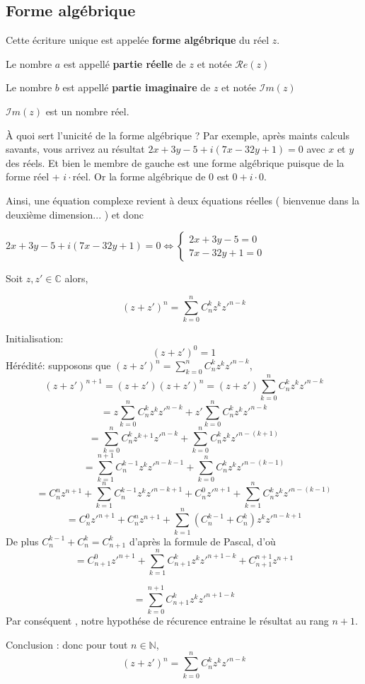 \documentclass[french]{book}
\newcommand{\bbc}{\mathbb {C}}
\newcommand{\calr}{\mathscr{R}}
\newcommand{\cali}{\mathscr{I}}
\newcommand{\RR}{\calr }
\newcommand{\IR}{\cali }
\begin{document}
\subsection{Forme algébrique}

Cette écriture unique est appelée \textbf{forme algébrique} du réel $z$.

Le nombre $a$ est appellé \textbf{partie réelle} de  $z$ et notée $\RR e(z)$

Le nombre $b$ est appellé \textbf{partie imaginaire} de  $z$ et notée $\IR m(z)$


  \begin{rem}
    $\IR m(z)$ est un nombre réel.
    \end{rem}
  


  
    \begin{rem}{\`A quoi sert l'unicité de la forme algébrique ?}
Par exemple,  après maints calculs  savants, vous arrivez au  résultat $
2x+3y-5+i(7x-32y+1)=0$ avec $x$ et $y$  des réels.  Et bien le membre de
gauche  est   une  forme   algébrique  puisque  de   la  forme   réel  +
$i\cdot$réel. Or la forme algébrique de 0 est $0+i\cdot0$.  

Ainsi,  une   équation  complexe   revient  à  deux   équations  réelles
( bienvenue dans la deuxième dimension... ) et donc 

$    2x+3y-5+i(7x-32y+1)=0   \Longleftrightarrow   \begin{cases}
    2x+3y-5=0\\ 7x-32y+1=0\end{cases}$
\end{rem}


\begin{thm}
Soit $z,z'\in \bbc$ alors, 

$$(z+z')^n=\sum_{k=0}^n C^k_nz^kz'^{n-k}$$

\end{thm}

\begin{demo}
Initialisation:
$$(z+z')^0=1$$
Hérédité: supposons que $(z+z')^n=\sum_{k=0}^n C^k_nz^kz'^{n-k}$,
$$(z+z')^{n+1}=(z+z')(z+z')^n=(z+z')\sum_{k=0}^n C^k_nz^kz'^{n-k}$$
$$=z\sum_{k=0}^n C^k_nz^kz'^{n-k}+z'\sum_{k=0}^n C^k_nz^kz'^{n-k}$$
$$=\sum_{k=0}^n C^k_nz^{k+1}z'^{n-k}+\sum_{k=0}^n C^k_nz^kz'^{n-(k+1)}$$
$$=\sum_{k=1}^{n+1} C^{k-1}_nz^{k}z'^{n-k-1}+\sum_{k=0}^n C^k_nz^kz'^{n-(k-1)}$$
$$=C^n_n z^{n+1} + \sum_{k=1}^{n} C^{k-1}_nz^{k}z'^{n-k+1} + C^0_nz'^{n+1} + \sum_{k=1}^n C^k_nz^kz'^{n-(k-1)} $$
$$= C^0_nz'^{n+1} + C^n_n z^{n+1} + \sum_{k=1}^{n} (C^{k-1}_n +C^k_n)z^{k}z'^{n-k+1}$$
De plus $C^{k-1}_n +C^k_n=C^k_{n+1}$ d'après la formule de Pascal, d'où
$$=C^0_{n+1}z'^{n+1}+ \sum_{k=1}^{n} C^k_{n+1} z^{k}z'^{n+1-k} + C^{n+1}_{n+1}z^{n+1}$$ 

$$=\sum_{k=0}^{n+1} C^k_{n+1} z^{k}z'^{n+1-k}$$
Par conséquent , notre hypothése de récurence entraine le résultat au rang $n+1$.

Conclusion : donc pour tout $n\in \mathbb{N}$, $$(z+z')^n=\sum_{k=0}^n C^k_nz^kz'^{n-k}$$

\end{demo}
\end{document}
